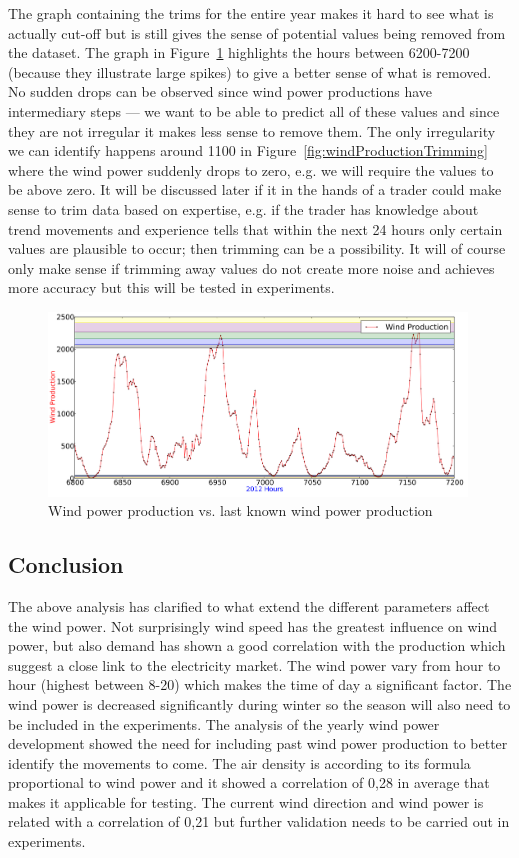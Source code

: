 The graph containing the trims for the entire year makes it hard to see what is actually cut-off but is still gives the sense of potential values being removed from the dataset. The graph in Figure~\ref{fig:pointingOutPlaceWhereTrim} highlights the hours between 6200-7200 (because they illustrate large spikes) to give a better sense of what is removed. No sudden drops can be observed since wind power productions have intermediary steps --- we want to be able to predict all of these values and since they are not irregular it makes less sense to remove them. The only irregularity we can identify happens around 1100 in Figure~\ref{fig:windProductionTrimming} where the wind power suddenly drops to zero, e.g. we will require the values to be above zero. It will be discussed later if it in the hands of a trader could make sense to trim data based on expertise, e.g. if the trader has knowledge about trend movements and experience tells that within the next 24 hours only certain values are plausible to occur; then trimming can be a possibility. It will of course only make sense if trimming away values do not create more noise and achieves more accuracy but this will be tested in experiments.

\begin{figure}[ht!]
\centering
\includegraphics[width=0.99\textwidth]{billeder/pointingOutPlaceWhereTrim.png}
\caption{Wind power production vs. last known wind power production}
\label{fig:pointingOutPlaceWhereTrim}
\end{figure}

\subsection{Conclusion}
The above analysis has clarified to what extend the different parameters affect the wind power. Not surprisingly wind speed has the greatest influence on wind power, but also demand has shown a good correlation with the production which suggest a close link to the electricity market. The wind power vary from hour to hour (highest between 8-20) which makes the time of day a significant factor. The wind power is decreased significantly during winter so the season will also need to be included in the experiments. The analysis of the yearly wind power development showed the need for including past wind power production to better identify the movements to come.
The air density is according to its formula proportional to wind power and it showed a correlation of 0,28 in average that makes it applicable for testing. The current wind direction and wind power is related with a correlation of 0,21 but further validation needs to be carried out in experiments.